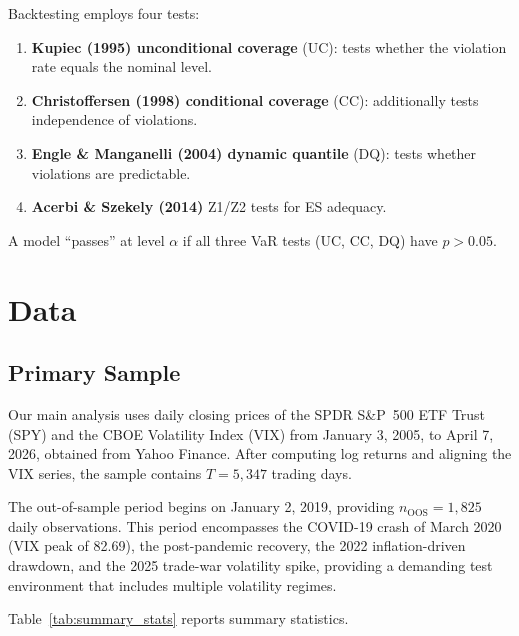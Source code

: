 \documentclass[12pt,a4paper]{article}
\begin{document}
Backtesting employs four tests:
\begin{enumerate}
\item \textbf{Kupiec (1995) unconditional coverage} (UC): tests whether the violation rate equals the nominal level.
\item \textbf{Christoffersen (1998) conditional coverage} (CC): additionally tests independence of violations.
\item \textbf{Engle \& Manganelli (2004) dynamic quantile} (DQ): tests whether violations are predictable.
\item \textbf{Acerbi \& Szekely (2014)} Z1/Z2 tests for ES adequacy.
\end{enumerate}

A model ``passes'' at level $\alpha$ if all three VaR tests (UC, CC, DQ) have $p > 0.05$.


\section{Data}
\label{sec:data}

\subsection{Primary Sample}

Our main analysis uses daily closing prices of the SPDR S\&P~500 ETF Trust (SPY) and the CBOE Volatility Index (VIX) from January 3, 2005, to April 7, 2026, obtained from Yahoo Finance. After computing log returns and aligning the VIX series, the sample contains $T = 5{,}347$ trading days.

The out-of-sample period begins on January 2, 2019, providing $n_{\text{OOS}} = 1{,}825$ daily observations. This period encompasses the COVID-19 crash of March 2020 (VIX peak of 82.69), the post-pandemic recovery, the 2022 inflation-driven drawdown, and the 2025 trade-war volatility spike, providing a demanding test environment that includes multiple volatility regimes.

Table~\ref{tab:summary_stats} reports summary statistics.
\end{document}
